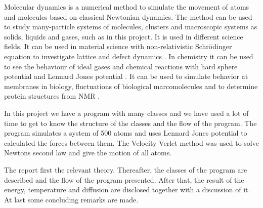 

Molecular dynamics is a numerical method to simulate the movement of atoms and molecules based on classical Newtonian dynamics. The method can be used to study many-particle systems of molecules, clusters and macroscopic systems as solids, liquids and gases, such as in this project. It is used in different science fields. It can be used in material science with non-relativistic Schrödinger equation to investigate lattice and defect dynamics \cite{materialphysics}. In chemistry it can be used to see the behaviour of ideal gases and chemical reactions with hard sphere potential and Lennard Jones potential \cite{GORECKI1989245}. It can be used to simulate behavior at membranes in biology, fluctuations of biological marcomolecules and to determine protein structures from NMR \cite{biology}.

In this project we have a program with many classes and we have used a lot of time to get to know the structure of the classes and the flow of the program. The program simulates a system of 500 atoms and uses Lennard Jones potential to calculated the forces between them. The Velocity Verlet method was used to solve Newtons second law and give the motion of all atoms.

The report first  the relevant theory. Thereafter, the classes of the program are described and the flow of the program presented. After that, the result of the energy, temperature and diffusion are disclosed together with a discussion of it. At last some concluding remarks are made. 

%
%
%
%
%	
%
